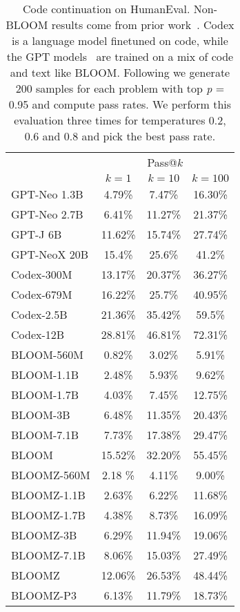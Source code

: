 \documentclass[11pt]{article}
\begin{document}
\begin{table}[h!]
    \centering
    \footnotesize
\begin{tabular}{lccc}
    \toprule
    & \multicolumn{3}{c}{Pass@$k$} \\
    & $k=1$ & $k=10$ & $k=100$ \\
    \midrule
    GPT-Neo 1.3B & 4.79\% & 7.47\% & 16.30\% \\
    GPT-Neo 2.7B & 6.41\% & 11.27\% & 21.37\% \\
    GPT-J 6B & 11.62\% & 15.74\% & 27.74\% \\
    GPT-NeoX 20B & 15.4\% & 25.6\% & 41.2\% \\
    \midrule
    Codex-300M & 13.17\% & 20.37\% & 36.27\% \\
    Codex-679M & 16.22\% & 25.7\% & 40.95\% \\
    Codex-2.5B & 21.36\% & 35.42\% & 59.5\% \\
    Codex-12B & 28.81\% & 46.81\% & 72.31\% \\
    \midrule
    BLOOM-560M & 0.82\% & 3.02\% & 5.91\% \\
    BLOOM-1.1B & 2.48\% & 5.93\% & 9.62\% \\
    BLOOM-1.7B & 4.03\% & 7.45\% & 12.75\% \\
    BLOOM-3B & 6.48\% & 11.35\% & 20.43\% \\
    BLOOM-7.1B & 7.73\% & 17.38\% & 29.47\% \\
    BLOOM & 15.52\% & 32.20\% & 55.45\% \\
    \midrule
    BLOOMZ-560M & 2.18 \% & 4.11\% & 9.00\% \\
    BLOOMZ-1.1B & 2.63\% & 6.22\% & 11.68\% \\
    BLOOMZ-1.7B & 4.38\% & 8.73\% & 16.09\% \\
    BLOOMZ-3B & 6.29\% & 11.94\% & 19.06\% \\
    BLOOMZ-7.1B & 8.06\% & 15.03\% & 27.49\% \\
    BLOOMZ & 12.06\% & 26.53\% & 48.44\% \\
    BLOOMZ-P3 & 6.13\% & 11.79\% & 18.73\% \\
    \bottomrule
    \end{tabular}
\caption{
        Code continuation on HumanEval. Non-BLOOM results come from prior work~\cite{chen2021evaluating,fried2022incoder}. Codex is a language model finetuned on code, while the GPT models~\cite{black2021gpt,wang2021gpt,black2022gpt} are trained on a mix of code and text like BLOOM. Following \citet{chen2021evaluating} we generate 200 samples for each problem with top \emph{p} = 0.95 and compute pass rates. We perform this evaluation three times for temperatures 0.2, 0.6 and 0.8 and pick the best pass rate.
    }
    \label{tab:humaneval}
\end{table}
\end{document}
